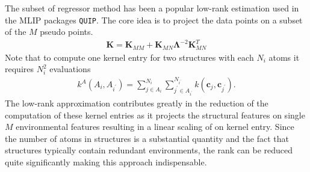The subset of regressor method\cite{quinonero2005unifying} has been a popular low-rank estimation used in the MLIP packages \texttt{QUIP}\cite{Csanyi2007-py}.
The core idea is to project the data points on a subset of the $M$ pseudo points.
\begin{subequations}
\begin{align}
  \mathbf{K} = \mathbf{K}_{MM} + \mathbf{K}_{MN}\mathbf{\Lambda}^{-2}\mathbf{K}_{MN}^T
\end{align}
\end{subequations}
Note that to compute one kernel entry for two structures with each $N_i$ atoms it requires $N_i^2$ evaluations
\begin{subequations}
\begin{align}
  k^A(A_{i}, A_{i^\prime}) = \sum_{j\in A_i}^{N_i}\sum_{j^\prime\in A_{i^\prime}}^{N_{i^{\prime}}} k(\mathbf{c}_j, \mathbf{c}_{j^\prime}).
\end{align}
\end{subequations}
The low-rank approximation contributes greatly in the reduction of the computation of these kernel entries as it projects the structural features on single $M$ environmental features resulting in a linear scaling of on kernel entry.
Since the number of atoms in structures is a substantial quantity and the fact that structures typically contain redundant environments, the rank can be reduced quite significantly making this approach indispensable.

